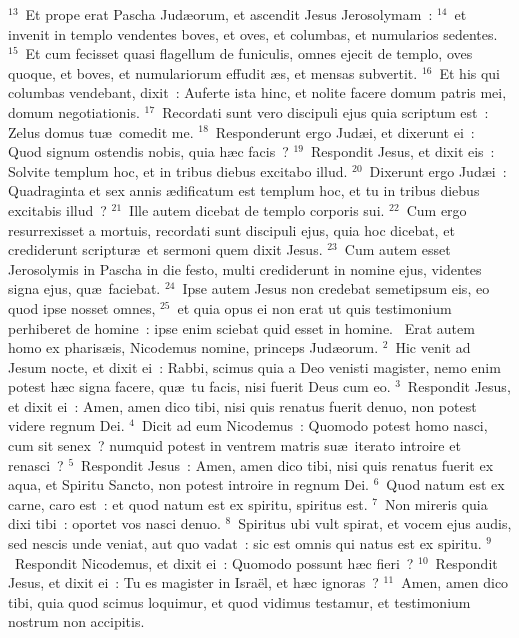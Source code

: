 ${}^{13}$~Et prope erat Pascha Jud\ae orum, et ascendit Jesus Jerosolymam~:
${}^{14}$~et invenit in templo vendentes boves, et oves, et columbas, et numularios sedentes.
${}^{15}$~Et cum fecisset quasi flagellum de funiculis, omnes ejecit de templo, oves quoque, et boves, et numulariorum effudit \ae s, et mensas subvertit.
${}^{16}$~Et his qui columbas vendebant, dixit~: Auferte ista hinc, et nolite facere domum patris mei, domum negotiationis.
${}^{17}$~Recordati sunt vero discipuli ejus quia scriptum est~: Zelus domus tu\ae\ comedit me.
${}^{18}$~Responderunt ergo Jud\ae i, et dixerunt ei~: Quod signum ostendis nobis, quia h\ae c facis~?
${}^{19}$~Respondit Jesus, et dixit eis~: Solvite templum hoc, et in tribus diebus excitabo illud.
${}^{20}$~Dixerunt ergo Jud\ae i~: Quadraginta et sex annis \ae dificatum est templum hoc, et tu in tribus diebus excitabis illud~?
${}^{21}$~Ille autem dicebat de templo corporis sui.
${}^{22}$~Cum ergo resurrexisset a mortuis, recordati sunt discipuli ejus, quia hoc dicebat, et crediderunt scriptur\ae\ et sermoni quem dixit Jesus.
${}^{23}$~Cum autem esset Jerosolymis in Pascha in die festo, multi crediderunt in nomine ejus, videntes signa ejus, qu\ae\ faciebat.
${}^{24}$~Ipse autem Jesus non credebat semetipsum eis, eo quod ipse nosset omnes,
${}^{25}$~et quia opus ei non erat ut quis testimonium perhiberet de homine~: ipse enim sciebat quid esset in homine.
~Erat autem homo ex pharis\ae is, Nicodemus nomine, princeps Jud\ae orum.
${}^{2}$~Hic venit ad Jesum nocte, et dixit ei~: Rabbi, scimus quia a Deo venisti magister, nemo enim potest h\ae c signa facere, qu\ae\ tu facis, nisi fuerit Deus cum eo.
${}^{3}$~Respondit Jesus, et dixit ei~: Amen, amen dico tibi, nisi quis renatus fuerit denuo, non potest videre regnum Dei.
${}^{4}$~Dicit ad eum Nicodemus~: Quomodo potest homo nasci, cum sit senex~? numquid potest in ventrem matris su\ae\ iterato introire et renasci~?
${}^{5}$~Respondit Jesus~: Amen, amen dico tibi, nisi quis renatus fuerit ex aqua, et Spiritu Sancto, non potest introire in regnum Dei.
${}^{6}$~Quod natum est ex carne, caro est~: et quod natum est ex spiritu, spiritus est.
${}^{7}$~Non mireris quia dixi tibi~: oportet vos nasci denuo.
${}^{8}$~Spiritus ubi vult spirat, et vocem ejus audis, sed nescis unde veniat, aut quo vadat~: sic est omnis qui natus est ex spiritu.
${}^{9}$~Respondit Nicodemus, et dixit ei~: Quomodo possunt h\ae c fieri~?
${}^{10}$~Respondit Jesus, et dixit ei~: Tu es magister in Isra\"el, et h\ae c ignoras~?
${}^{11}$~Amen, amen dico tibi, quia quod scimus loquimur, et quod vidimus testamur, et testimonium nostrum non accipitis.
